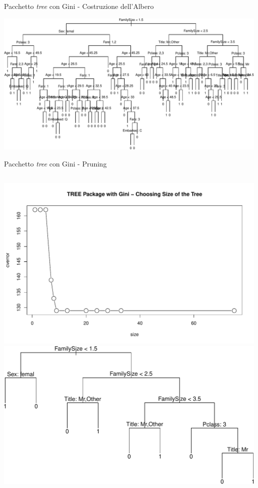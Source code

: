 \documentclass[9pt, xcolor=table]{beamer}
\begin{document}
	\begin{frame}{Pacchetto \textit{tree} con Gini - Costruzione dell'Albero}
		
		
		\vfill
		
		\centering
		\includegraphics[scale=0.58]{tree-gini-tree}
		
	\end{frame}
	
	\begin{frame}{Pacchetto \textit{tree} con Gini - Pruning}
		
		
		\begin{columns}
			\centering
			\includegraphics[scale=0.26]{tree-gini-size-plot}
			\centering
			\includegraphics[scale=0.3]{tree-gini-pruned}
		\end{columns}	
	\end{frame}
\end{document}
